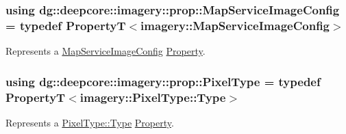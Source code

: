 \subsubsection[{\texorpdfstring{Map\+Service\+Image\+Config}{MapServiceImageConfig}}]{\setlength{\rightskip}{0pt plus 5cm}using {\bf dg\+::deepcore\+::imagery\+::prop\+::\+Map\+Service\+Image\+Config} = typedef {\bf PropertyT}$<${\bf imagery\+::\+Map\+Service\+Image\+Config}$>$}\hypertarget{namespacedg_1_1deepcore_1_1imagery_1_1prop_a6258024c09a988041dea18a5d2a8a39e}{}\label{namespacedg_1_1deepcore_1_1imagery_1_1prop_a6258024c09a988041dea18a5d2a8a39e}


Represents a \hyperlink{structdg_1_1deepcore_1_1imagery_1_1_map_service_image_config}{Map\+Service\+Image\+Config} \hyperlink{classdg_1_1deepcore_1_1_property}{Property}. 

\subsubsection[{\texorpdfstring{Pixel\+Type}{PixelType}}]{\setlength{\rightskip}{0pt plus 5cm}using {\bf dg\+::deepcore\+::imagery\+::prop\+::\+Pixel\+Type} = typedef {\bf PropertyT}$<${\bf imagery\+::\+Pixel\+Type\+::\+Type}$>$}\hypertarget{namespacedg_1_1deepcore_1_1imagery_1_1prop_ae1301ea34a89bf56243b8bd9e9580e65}{}\label{namespacedg_1_1deepcore_1_1imagery_1_1prop_ae1301ea34a89bf56243b8bd9e9580e65}


Represents a \hyperlink{namespacedg_1_1deepcore_1_1imagery_1_1_pixel_type_a5f0c62edf4601cbd15e52b381697069d}{Pixel\+Type\+::\+Type} \hyperlink{classdg_1_1deepcore_1_1_property}{Property}. 

